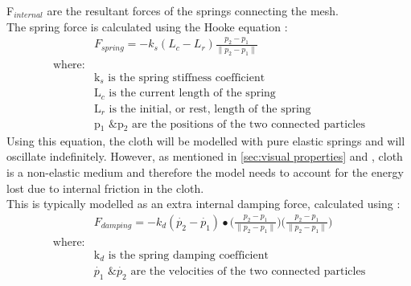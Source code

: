 F$_{internal}$ are the resultant forces of the springs connecting the mesh.
\\The spring force is calculated using the Hooke equation \parencite[201]{Parent2012}:
\begin{equation}
\begin{split}
\label{eq:hooke equation}
  &F_{spring} = -k_{s}(L_{c}-L_{r})\frac{p_{2}-p_{1}}{\parallel p_{2}-p_{1}\parallel}
  \\\text{where:}
  \\&\text{k$_{s}$ is the spring stiffness coefficient}
  \\&\text{L$_{c}$ is the current length of the spring}
  \\&\text{L$_{r}$ is the initial, or rest, length of the spring}
  \\&\text{p$_{1}$ \& p$_{2}$ are the positions of the two connected particles}
\end{split}
\end{equation}
Using this equation, the cloth will be modelled with pure elastic springs and will oscillate indefinitely. However, as mentioned in \ref{sec:visual properties} and \parencite[1]{Provot2001}, cloth is a non-elastic medium and therefore the model needs to account for the energy lost due to internal friction in the cloth.
\\This is typically modelled as an extra internal damping force, calculated using \parencite[201]{Parent2012}:
\begin{equation}
\begin{split}
\label{eq:spring damping}
  &F_{damping} = -k_{d}(\dot{p_{2}}-\dot{p_{1}})\bullet\bigg(\frac{p_{2}-p_{1}}{\parallel p_{2}-p_{1}\parallel}\bigg)\bigg(\frac{p_{2}-p_{1}}{\parallel p_{2}-p_{1}\parallel}\bigg)
  \\\text{where:}
  \\&\text{k$_{d}$ is the spring damping coefficient}
  \\&\text{$\dot{p_{1}}$ \& $\dot{p_{2}}$ are the velocities of the two connected particles}
\end{split}
\end{equation}


